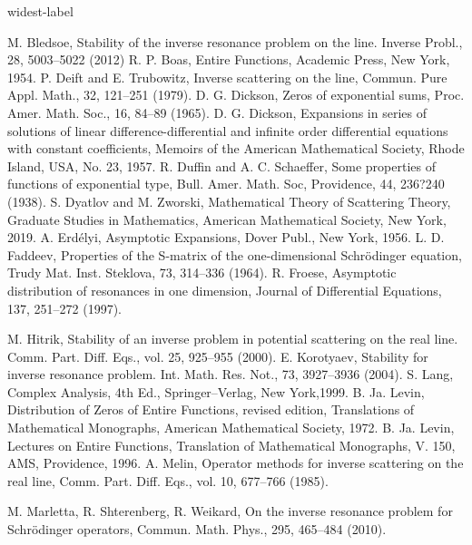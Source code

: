 \documentclass[10pt,a4paper]{article}
\theoremstyle{plain}
\theoremstyle{definition}
\theoremstyle{remark}
\numberwithin{equation}{section}
\begin{document}
\begin{thebibliography}{widest-label}


 M. Bledsoe, Stability of the inverse resonance problem on the line. Inverse Probl., 28, 5003--5022 (2012)
R. P. Boas, Entire Functions, Academic Press, New York, 1954.
P. Deift and E. Trubowitz, Inverse scattering on the line, Commun. Pure Appl. Math., 32, 121--251 (1979). 
D. G. Dickson, Zeros of exponential sums, Proc. Amer. Math. Soc., 16, 84--89 (1965).
D. G. Dickson, Expansions in series of solutions
of linear difference-differential and infinite order differential
equations with constant coefficients, Memoirs of the American
Mathematical Society, Rhode Island, USA, No. 23, 1957.
R. Duffin and A. C. Schaeffer, Some properties of functions of exponential type, Bull. Amer. Math. Soc, Providence, 44, 236?240 (1938).
S. Dyatlov and M. Zworski, Mathematical Theory of Scattering Theory, Graduate Studies in Mathematics, American Mathematical Society, New York, 2019.
A. Erd\'{e}lyi, Asymptotic Expansions, Dover Publ., New York, 1956.
L. D. Faddeev,   Properties of the S-matrix of the one-dimensional Schr\"{o}dinger equation, Trudy Mat. Inst. Steklova, 73, 314--336 (1964). 
R. Froese, Asymptotic distribution of resonances in one dimension, Journal of Differential Equations, 137, 251--272 (1997).

M. Hitrik, Stability of an inverse problem in potential scattering on the real line. Comm. Part. Diff. Eqs., vol. 25, 925--955 (2000).
E. Korotyaev, Stability for inverse resonance problem. Int. Math. Res. Not., 73, 3927--3936 (2004).
S. Lang, Complex Analysis, 4th Ed., Springer--Verlag, New York,1999.
B. Ja. Levin, Distribution of Zeros of Entire
Functions, revised edition, Translations of Mathematical
Monographs, American Mathematical Society, 1972.
B. Ja. Levin, Lectures on Entire Functions,
Translation of Mathematical Monographs, V. 150, AMS, Providence, 1996.
A. Melin, Operator methods for inverse scattering on the real line, Comm. Part. Diff. Eqs., vol. 10,  677--766 (1985).


M. Marletta, R. Shterenberg, R. Weikard, On the inverse resonance problem for Schr\"{o}dinger operators, Commun. Math. Phys., 295, 465--484 (2010).


\end{thebibliography}
\end{document}
